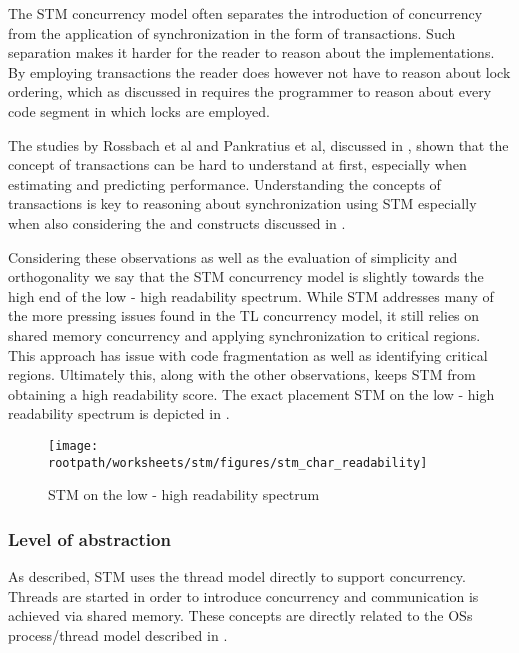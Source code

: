 The \ac{STM} concurrency model often separates the introduction of concurrency from the application of synchronization in the form of transactions. Such separation makes it harder for the reader to reason about the implementations. By employing transactions the reader does however not have to reason about lock ordering, which as discussed in  requires the programmer to reason about every code segment in which locks are employed.

The studies by Rossbach et al and Pankratius et al, discussed in , shown that the concept of transactions can be hard to understand at first, especially when estimating and predicting performance. Understanding the concepts of transactions is key to reasoning about synchronization using \ac{STM} especially when also considering the  and  constructs discussed in .

Considering these observations as well as the evaluation of simplicity and orthogonality we say that the \ac{STM} concurrency model is slightly towards the high end of the low - high readability spectrum. While \ac{STM} addresses many of the more pressing issues found in the \ac{TL} concurrency model, it still relies on shared memory concurrency and applying synchronization to critical regions. This approach has issue with code fragmentation as well as identifying critical regions. Ultimately this, along with the other observations, keeps \ac{STM} from obtaining a high readability score. The exact placement \ac{STM} on the low - high readability spectrum is depicted in .

\begin{figure}[htbp]
\centering
 \texttt{[image: \\rootpath/worksheets/stm/figures/stm\_char\_readability]} 
 \caption{\ac{STM} on the low - high readability spectrum}
\label{fig:char_stm_readability}
\end{figure}

\subsubsection{Level of abstraction}\label{sec:stm_level_of_abstraction}
As described, \ac{STM} uses the thread model directly to support concurrency. Threads are started in order to introduce concurrency and communication is achieved via shared memory. These concepts are directly related to the \acp{OS} process/thread model described in .


